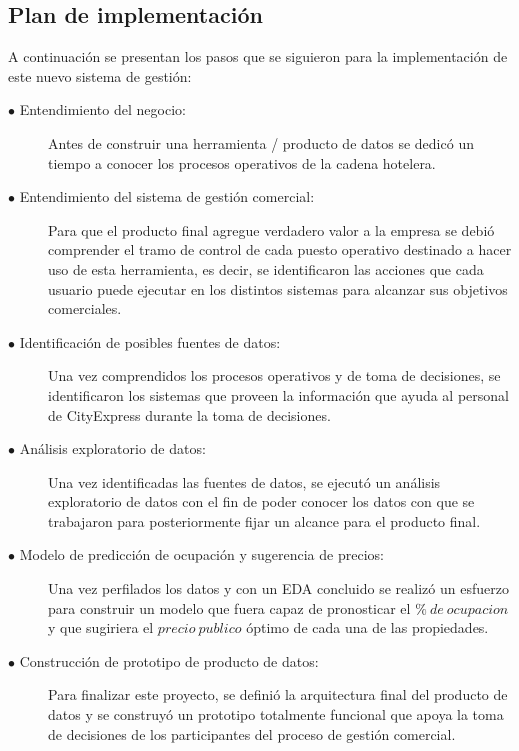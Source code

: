 \documentclass[a4paper,11pt]{article}
\begin{document}
\subsection{Plan de implementación}
A continuación se presentan los pasos que se siguieron para la implementación de este nuevo sistema de gestión:
\begin{description}
\item [$\bullet$ Entendimiento del negocio:]  Antes de construir una herramienta / producto de datos se dedicó un tiempo a conocer los procesos operativos de la cadena hotelera.
\item [$\bullet$ Entendimiento del sistema de gestión comercial:] Para que el producto final agregue verdadero valor a la empresa se debió comprender el tramo de control de cada puesto operativo destinado a hacer uso de esta herramienta, es decir, se identificaron las acciones que cada usuario puede ejecutar en los distintos sistemas para alcanzar sus objetivos comerciales.
\item [$\bullet$ Identificación de posibles fuentes de datos:] Una vez comprendidos los procesos operativos y de toma de decisiones, se identificaron los sistemas que proveen la información que ayuda al personal de CityExpress durante la toma de decisiones.
\item [$\bullet$ Análisis exploratorio de datos:] Una vez identificadas las fuentes de datos, se ejecutó un análisis exploratorio de datos con el fin de poder conocer los datos con que se trabajaron para posteriormente fijar un alcance para el producto final.
\item [$\bullet$ Modelo de predicción de ocupación y sugerencia de precios:] Una vez perfilados los datos y con un EDA concluido se realizó un esfuerzo para construir un modelo que fuera capaz de pronosticar el $\%\ de\ ocupacion$ y que sugiriera el $precio\ publico$ óptimo de cada una de las propiedades.
\item [$\bullet$ Construcción de prototipo de producto de datos:] Para finalizar este proyecto, se definió la arquitectura final del producto de datos y se construyó un prototipo totalmente funcional que apoya la toma de decisiones de los participantes del proceso de gestión comercial.
\end{description}
\end{document}
